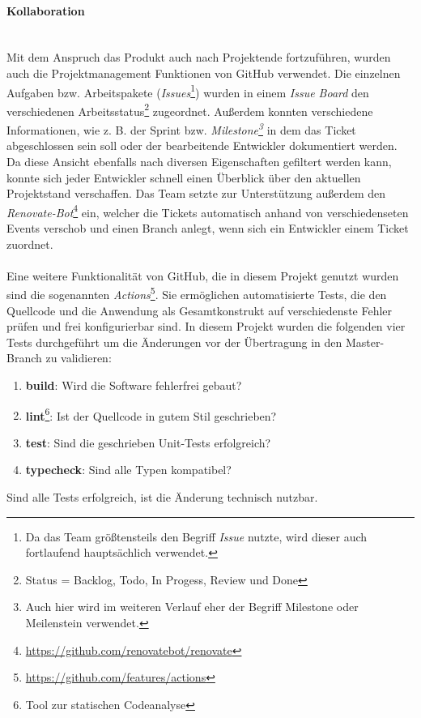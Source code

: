 \documentclass[10pt, a4paper]{article}
\begin{document}
\paragraph{Kollaboration} $~$ \\
Mit dem Anspruch das Produkt auch nach Projektende fortzuführen, wurden auch die Projektmanagement Funktionen von GitHub verwendet. Die einzelnen Aufgaben bzw. Arbeitspakete (\textit{Issues}\footnote{Da das Team größtensteils den Begriff \textit{Issue} nutzte, wird dieser auch fortlaufend hauptsächlich verwendet.}) wurden in einem \textit{Issue Board} den verschiedenen Arbeitsstatus\footnote{Status = Backlog, Todo, In Progess, Review und Done}
zugeordnet. Außerdem konnten verschiedene Informationen, wie z. B. der Sprint bzw. \textit{Milestone\footnote{Auch hier wird im weiteren Verlauf eher der Begriff Milestone oder Meilenstein verwendet.}} in dem das Ticket abgeschlossen sein soll oder der bearbeitende Entwickler dokumentiert werden.
Da diese Ansicht ebenfalls nach diversen Eigenschaften gefiltert werden kann, konnte sich jeder Entwickler schnell einen Überblick über den aktuellen Projektstand verschaffen.
Das Team setzte zur Unterstützung außerdem den \textit{Renovate-Bot}\footnote{\raggedright\url{https://github.com/renovatebot/renovate}} ein, welcher die Tickets automatisch anhand von verschiedenseten Events verschob und einen Branch anlegt, wenn sich ein Entwickler einem Ticket zuordnet.
\\~\\
Eine weitere Funktionalität von GitHub, die in diesem Projekt genutzt wurden sind die sogenannten \textit{Actions}\footnote{\raggedright\url{https://github.com/features/actions}}.
Sie ermöglichen automatisierte Tests, die den Quellcode und die Anwendung als Gesamtkonstrukt auf verschiedenste Fehler prüfen und frei konfigurierbar sind.
In diesem Projekt wurden die folgenden vier Tests durchgeführt um die Änderungen vor der Übertragung in den Master-Branch zu validieren:
\begin{enumerate}
  \item \textbf{build}: Wird die Software fehlerfrei gebaut?
  \item \textbf{lint}\footnote{Tool zur statischen Codeanalyse}: Ist der Quellcode in gutem Stil geschrieben?
  \item \textbf{test}: Sind die geschrieben Unit-Tests erfolgreich?
  \item \textbf{typecheck}: Sind alle Typen kompatibel?
\end{enumerate}
Sind alle Tests erfolgreich, ist die Änderung technisch nutzbar.
\end{document}
